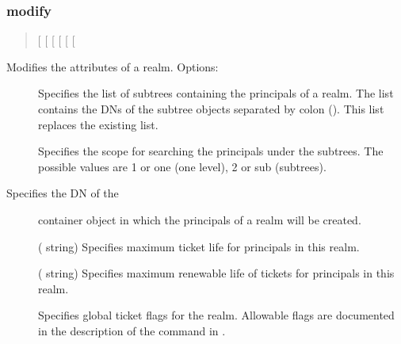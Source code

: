 \documentclass[letterpaper,10pt,english]{sphinxmanual}
\begin{document}
\subsubsection{modify}
\label{\detokenize{admin/admin_commands/kdb5_ldap_util:kdb5-ldap-util-create-end}}\label{\detokenize{admin/admin_commands/kdb5_ldap_util:modify}}\label{\detokenize{admin/admin_commands/kdb5_ldap_util:kdb5-ldap-util-modify}}\begin{quote}

{[} \sphinxstyleemphasis{subtree\_dn\_list}{]}
{[} \sphinxstyleemphasis{search\_scope}{]}
{[} \sphinxstyleemphasis{container\_reference\_dn}{]}
{[} \sphinxstyleemphasis{max\_ticket\_life}{]}
{[} \sphinxstyleemphasis{max\_renewable\_ticket\_life}{]}
{[}\sphinxstyleemphasis{ticket\_flags}{]}
\end{quote}

Modifies the attributes of a realm.  Options:
\begin{description}
\item[{ }] \leavevmode
Specifies the list of subtrees containing the principals of a
realm.  The list contains the DNs of the subtree objects separated
by colon (\sphinxcode{:}).  This list replaces the existing list.

\item[{ }] \leavevmode
Specifies the scope for searching the principals under the
subtrees.  The possible values are 1 or one (one level), 2 or sub
(subtrees).

\item[{  Specifies the DN of the}] \leavevmode
container object in which the principals of a realm will be
created.

\item[{ }] \leavevmode
( string) Specifies maximum ticket life for
principals in this realm.

\item[{ }] \leavevmode
( string) Specifies maximum renewable life of
tickets for principals in this realm.

\item[{}] \leavevmode
Specifies global ticket flags for the realm.  Allowable flags are
documented in the description of the  command in
{\hyperref[\detokenize{admin/admin_commands/kadmin_local:kadmin-1}]{}}.

\end{description}
\end{document}

